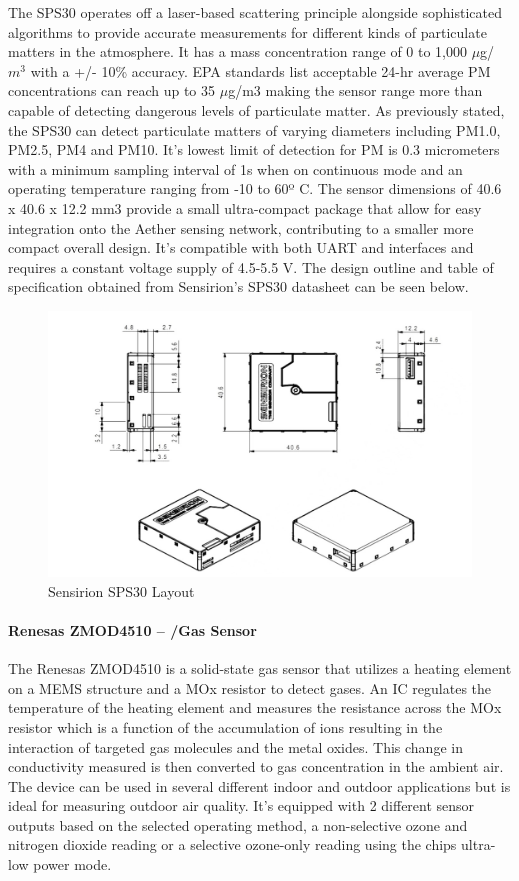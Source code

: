 The SPS30 operates off a laser-based scattering principle alongside sophisticated algorithms to provide accurate measurements for different kinds of particulate matters in the atmosphere. It has a mass concentration range of 0 to 1,000 $\mu$g/$m^3$ with a +/- 10\% accuracy. EPA standards list acceptable 24-hr average PM concentrations can reach up to 35 $\mu$g/m3 making the sensor range more than capable of detecting dangerous levels of particulate matter. As previously stated, the SPS30 can detect particulate matters of varying diameters including PM1.0, PM2.5, PM4 and PM10. It’s lowest limit of detection for PM is 0.3 micrometers with a minimum sampling interval of 1s when on continuous mode and an operating temperature ranging from -10 to 60º C. The sensor dimensions of 40.6 x 40.6 x 12.2 mm3 provide a small ultra-compact package that allow for easy integration onto the Aether sensing network, contributing to a smaller more compact overall design. It’s compatible with both UART and \iic interfaces and requires a constant voltage supply of 4.5-5.5 V. The design outline and table of specification obtained from Sensirion’s SPS30 datasheet can be seen below.


\begin{figure}
\centering
\includegraphics[width=6in]{figures/PM sensor layout.jpg}
\caption{Sensirion SPS30 Layout\cite{ds-Sensirion-SPS30}}
\label{fig:Renesas Sensor Op}
\end{figure}

\paragraph{Renesas ZMOD4510 – \ndo/\ozone Gas Sensor }
The Renesas ZMOD4510 is a solid-state gas sensor that utilizes a heating element on a MEMS structure and a MOx resistor to detect gases. An IC regulates the temperature of the heating element and measures the resistance across the MOx resistor which is a function of the accumulation of ions resulting in the interaction of targeted gas molecules and the metal oxides. This change in conductivity measured is then converted to gas concentration in the ambient air. The device can be used in several different indoor and outdoor applications but is ideal for measuring outdoor air quality. It’s equipped with 2 different sensor outputs based on the selected operating method, a non-selective ozone and nitrogen dioxide reading or a selective ozone-only reading using the chips ultra-low power mode.

